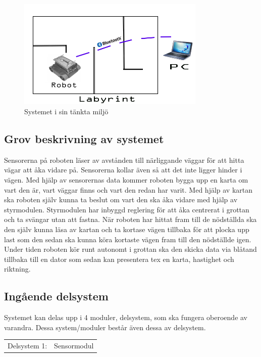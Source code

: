 \documentclass[11pt]{article}
\begin{document}
\begin{flushleft}
\begin{figure}[H]
\centering
\includegraphics[width=0.8\textwidth]{system_omgivning}
\caption{Systemet i sin tänkta miljö}
\label{figure:Systemöversikt}
\end{figure}

\subsection{Grov beskrivning av systemet}
Sensorerna på roboten läser av avstånden till närliggande väggar för att hitta vägar att åka vidare på. Sensorerna kollar även så att det inte ligger hinder i vägen. Med hjälp av sensorernas data kommer roboten bygga upp en karta om vart den är, vart väggar finns och vart den redan har varit. Med hjälp av kartan ska roboten själv kunna ta beslut om vart den ska åka vidare med hjälp av styrmodulen.
Styrmodulen har inbyggd reglering för att åka centrerat i grottan och ta svängar utan att fastna. När roboten har hittat fram till de nödställda ska den själv kunna läsa av kartan och ta kortase vägen tillbaka för att plocka upp last som den sedan ska kunna köra kortaste vägen fram till den nödställde igen. Under tiden roboten kör runt autonomt i grottan ska den skicka data via blåtand tillbaka till en dator som sedan kan presentera tex en karta, hastighet och riktning.    
 
\subsection{Ingående delsystem}
Systemet kan delas upp i 4 moduler, delsystem, som ska fungera oberoende av varandra. Dessa system/moduler består även dessa av delsystem.


\begin{table}[ht]

\centering
\begin{tabular}{c l}
Delsystem 1:&
Sensormodul \\


\end{tabular}
\end{table}
\end{flushleft}
\end{document}

